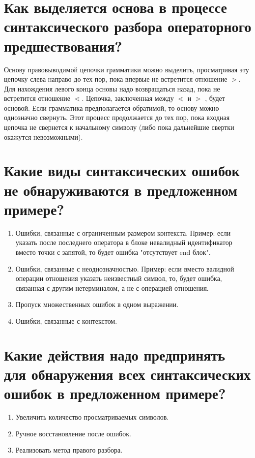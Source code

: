\section{Как выделяется основа в процессе синтаксического разбора операторного предшествования?}

Основу правовыводимой цепочки грамматики можно выделить, просматривая эту цепочку слева направо до тех пор, пока впервые не встретится отношение $\gtrdot$. Для нахождения левого конца основы надо возвращаться назад, пока не встретится отношение $\lessdot$. Цепочка, заключенная между $\lessdot$ и $\gtrdot$ , будет основой. Если грамматика предполагается обратимой, то основу можно однозначно свернуть. Этот процесс продолжается до тех пор, пока входная цепочка не свернется к начальному символу (либо пока дальнейшие свертки окажутся невозможными).

\section{Какие виды синтаксических ошибок не обнаруживаются в предложенном примере?}

\begin{enumerate}
	\item Ошибки, связанные с ограниченным размером контекста. Пример: если указать после последнего оператора в блоке невалидный идентификатор вместо точки с запятой, то будет ошибка "отсутствует end блок".
	\item Ошибки, связанные с неоднозначностью. Пример: если вместо валидной операции отношения указать неизвестный символ, то, будет ошибка, связанная с другим нетерминалом, а не с операцией отношения.
	\item Пропуск множественных ошибок в одном выражении.
	\item Ошибки, связанные с контекстом.
\end{enumerate}

\section{Какие действия надо предпринять для обнаружения всех синтаксических ошибок в предложенном примере?}

\begin{enumerate}
	\item Увеличить количество просматриваемых символов.
	\item Ручное восстановление после ошибок.
	\item Реализовать метод правого разбора.
\end{enumerate}

